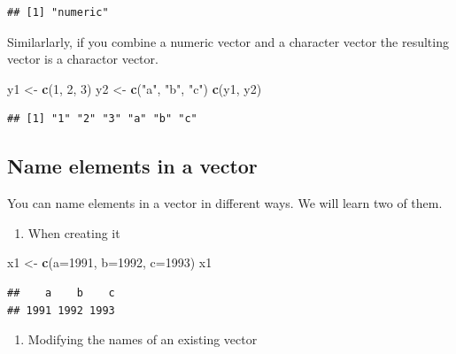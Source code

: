 \documentclass[]{book}
\newenvironment{Shaded}{\begin{snugshade}}{\end{snugshade}}
\newcommand{\DataTypeTok}[1]{\textcolor[rgb]{0.13,0.29,0.53}{#1}}
\newcommand{\DecValTok}[1]{\textcolor[rgb]{0.00,0.00,0.81}{#1}}
\newcommand{\KeywordTok}[1]{\textcolor[rgb]{0.13,0.29,0.53}{\textbf{#1}}}
\newcommand{\NormalTok}[1]{#1}
\newcommand{\StringTok}[1]{\textcolor[rgb]{0.31,0.60,0.02}{#1}}
\providecommand{\tightlist}{%
  \setlength{\itemsep}{0pt}\setlength{\parskip}{0pt}}
\begin{document}
\begin{verbatim}
## [1] "numeric"
\end{verbatim}

Similarlarly, if you combine a numeric vector and a character vector the resulting vector is a charactor vector.

\begin{Shaded}
\begin{Highlighting}[]
\NormalTok{y1 <-}\StringTok{ }\KeywordTok{c}\NormalTok{(}\DecValTok{1}\NormalTok{, }\DecValTok{2}\NormalTok{, }\DecValTok{3}\NormalTok{)}
\NormalTok{y2 <-}\StringTok{ }\KeywordTok{c}\NormalTok{(}\StringTok{"a"}\NormalTok{, }\StringTok{"b"}\NormalTok{, }\StringTok{"c"}\NormalTok{)}
\KeywordTok{c}\NormalTok{(y1, y2)}
\end{Highlighting}
\end{Shaded}

\begin{verbatim}
## [1] "1" "2" "3" "a" "b" "c"
\end{verbatim}

\hypertarget{name-elements-in-a-vector}{%
\subsection{Name elements in a vector}\label{name-elements-in-a-vector}}

You can name elements in a vector in different ways. We will learn two of them.

\begin{enumerate}
\def\labelenumi{\arabic{enumi}.}
\tightlist
\item
  When creating it
\end{enumerate}

\begin{Shaded}
\begin{Highlighting}[]
\NormalTok{x1 <-}\StringTok{ }\KeywordTok{c}\NormalTok{(}\DataTypeTok{a=}\DecValTok{1991}\NormalTok{, }\DataTypeTok{b=}\DecValTok{1992}\NormalTok{, }\DataTypeTok{c=}\DecValTok{1993}\NormalTok{)}
\NormalTok{x1}
\end{Highlighting}
\end{Shaded}

\begin{verbatim}
##    a    b    c 
## 1991 1992 1993
\end{verbatim}

\begin{enumerate}
\def\labelenumi{\arabic{enumi}.}
\setcounter{enumi}{1}
\tightlist
\item
  Modifying the names of an existing vector
\end{enumerate}
\end{document}
